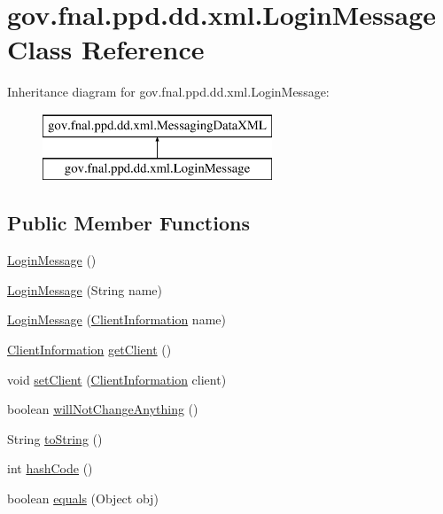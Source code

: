 \hypertarget{classgov_1_1fnal_1_1ppd_1_1dd_1_1xml_1_1LoginMessage}{\section{gov.\-fnal.\-ppd.\-dd.\-xml.\-Login\-Message Class Reference}
\label{classgov_1_1fnal_1_1ppd_1_1dd_1_1xml_1_1LoginMessage}
}
Inheritance diagram for gov.\-fnal.\-ppd.\-dd.\-xml.\-Login\-Message\-:\begin{figure}[H]
\begin{center}
\leavevmode
\includegraphics[height=2.000000cm]{classgov_1_1fnal_1_1ppd_1_1dd_1_1xml_1_1LoginMessage}
\end{center}
\end{figure}
\subsection*{Public Member Functions}
\begin{DoxyCompactItemize}
\item 
\hyperlink{classgov_1_1fnal_1_1ppd_1_1dd_1_1xml_1_1LoginMessage_af4a6018a252e8196bc95633249f027f0}{Login\-Message} ()
\item 
\hyperlink{classgov_1_1fnal_1_1ppd_1_1dd_1_1xml_1_1LoginMessage_ae53b8f3e945953bb6e43c3f3b4d528d4}{Login\-Message} (String name)
\item 
\hyperlink{classgov_1_1fnal_1_1ppd_1_1dd_1_1xml_1_1LoginMessage_a7ea2ca16406d4156bb09555e8f616dc9}{Login\-Message} (\hyperlink{classgov_1_1fnal_1_1ppd_1_1dd_1_1xml_1_1ClientInformation}{Client\-Information} name)
\item 
\hyperlink{classgov_1_1fnal_1_1ppd_1_1dd_1_1xml_1_1ClientInformation}{Client\-Information} \hyperlink{classgov_1_1fnal_1_1ppd_1_1dd_1_1xml_1_1LoginMessage_a87b7455b7ccbaa158d24795615c6e24c}{get\-Client} ()
\item 
void \hyperlink{classgov_1_1fnal_1_1ppd_1_1dd_1_1xml_1_1LoginMessage_ad712964945b6f342135c0dd29322ce9b}{set\-Client} (\hyperlink{classgov_1_1fnal_1_1ppd_1_1dd_1_1xml_1_1ClientInformation}{Client\-Information} client)
\item 
boolean \hyperlink{classgov_1_1fnal_1_1ppd_1_1dd_1_1xml_1_1LoginMessage_af0fee481ce7ca99e0aa9c499df2745a7}{will\-Not\-Change\-Anything} ()
\item 
String \hyperlink{classgov_1_1fnal_1_1ppd_1_1dd_1_1xml_1_1LoginMessage_a64b4342fb3c26620e05dbc67b104e1fe}{to\-String} ()
\item 
int \hyperlink{classgov_1_1fnal_1_1ppd_1_1dd_1_1xml_1_1LoginMessage_a957d681963bf69a6354890df71ba4277}{hash\-Code} ()
\item 
boolean \hyperlink{classgov_1_1fnal_1_1ppd_1_1dd_1_1xml_1_1LoginMessage_aaa74b60bd701bf0c4250e13f5474d013}{equals} (Object obj)
\end{DoxyCompactItemize}


